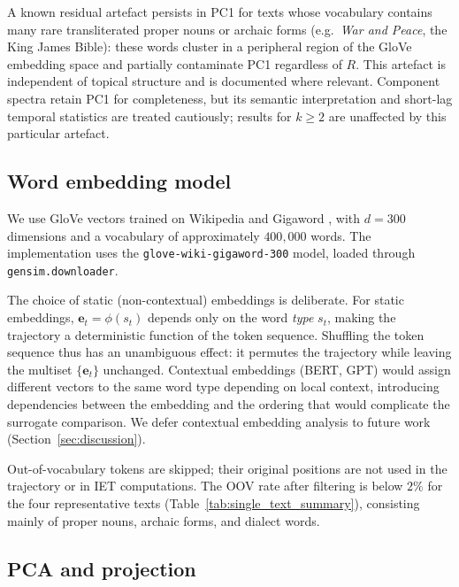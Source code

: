 \documentclass[12pt,a4paper]{article}
\newcommand{\et}{\mathbf{e}_t}
\begin{document}

A known residual artefact persists in PC1 for texts whose vocabulary
contains many rare transliterated proper nouns or archaic forms
(e.g.\ \emph{War and Peace}, the King James Bible): these words
cluster in a peripheral region of the GloVe embedding space and
partially contaminate PC1 regardless of $R$.
This artefact is independent of topical structure and is documented
where relevant. Component spectra retain PC1 for completeness, but its
semantic interpretation and short-lag temporal statistics are treated
cautiously; results for $k \geq 2$ are unaffected by this particular
artefact.

\subsection{Word embedding model}
\label{sec:embedding}

We use GloVe vectors trained on Wikipedia and Gigaword
\citep{Pennington2014}, with $d = 300$ dimensions and a vocabulary of
approximately $400{,}000$ words. The implementation uses the
\texttt{glove-wiki-\allowbreak gigaword-300} model, loaded through
\texttt{gensim.\allowbreak downloader}.

The choice of static (non-contextual) embeddings is deliberate.
For static embeddings, $\et = \phi(s_t)$ depends only on the word
\emph{type} $s_t$, making the trajectory a deterministic function of
the token sequence.
Shuffling the token sequence thus has an unambiguous effect: it
permutes the trajectory while leaving the multiset $\{\et\}$
unchanged.
Contextual embeddings (BERT, GPT) would assign different vectors to
the same word type depending on local context, introducing dependencies
between the embedding and the ordering that would complicate the
surrogate comparison.
We defer contextual embedding analysis to future work
(Section~\ref{sec:discussion}).

Out-of-vocabulary tokens are skipped; their original positions are not
used in the trajectory or in IET computations.
The OOV rate after filtering is below $2\%$ for the four representative
texts (Table~\ref{tab:single_text_summary}), consisting mainly of
proper nouns, archaic forms, and dialect words.

\subsection{PCA and projection}
\label{sec:pca_pipeline}
\end{document}
